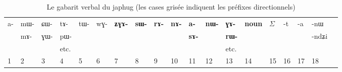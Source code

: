 \documentclass[oldfontcommands,oneside,a4paper,11pt]{article}
\newcommand{\ipab}[1]{{\scriptsize \phon#1}}
\newcommand{\grise}[1]{\cellcolor{lightgray}\textbf{#1}}
\begin{document}
   \begin{landscape}
\begin{table}[h]
\caption{Le gabarit verbal du japhug (les cases grisée indiquent les préfixes directionnels)}\label{tab:gabarit}
\begin{tabular}{llllll|llllllll|lllll} \toprule
 
\ipab{a-}  &  	\ipab{mɯ- }   &  	\ipab{ɕɯ-}   &\ipab{tɤ-} &  	\ipab{tɯ-}  &  	\ipab{wɣ-}   &

  	 \grise{\ipab{ʑɣɤ-}}  &  	\grise{\ipab{sɯ-}}  & \grise{\ipab{rɤ-}}& \grise{\ipab{nɤ-}} &   	 \grise{\ipab{a-}}   &  	\grise{\ipab{nɯ-}}  &  	\grise{\ipab{ɣɤ-}}  &  	\grise{\ipab{noun}}    &  	 \begin{math}\Sigma\end{math}    &  	\ipab{-t}  &  	\ipab{-a}  &  	\ipab{-nɯ}   &  \\
   &  	\ipab{mɤ-}   &  	\ipab{ɣɯ-}   &\ipab{pɯ-}&  	  &  	 
    & \grise{ }	  &  	 \grise{ }	  &  	  \grise{ }	  &  	   \grise{ }	&  	\grise{\ipab{sɤ-}}&  \grise{ }	 &  	\grise{\ipab{rɯ-}}  &  	 \grise{ }	  &  	  &  	  &  	  &  	\ipab{-ndʑi} &  \\
  &  	   &     &  etc.	  & & 	  &  	  &  	 & &  	  &  	 & &  etc.	  &  	  &  	  &  	  &  	  &  	  &  \\
1  &  	2  &  	3  &  	4  &  	5  &  	6  &  	7  &  	8  &  	9  &  	10  &  	11  &  	12  &  	13  &  	14  &  	15  & 16 &17&18\\
\bottomrule
\end{tabular}
\end{table}
\begin{multicols}{2}
\begin{enumerate}



\end{enumerate}
\end{multicols}
\end{landscape}
\end{document}
